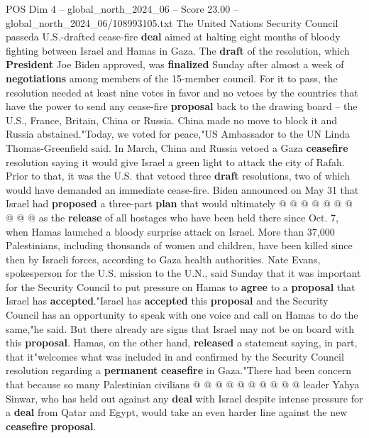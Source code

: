 \begin{textsample}{POS Dim 4 – global\_north\_2024\_06 – Score 23.00 – global\_north\_2024\_06/108993105.txt}  \label{ex:f4_pos_138}
The United Nations Security Council passeda U.S.-drafted cease-fire \textbf{deal} aimed at halting eight months of bloody fighting between Israel and Hamas in Gaza.
The \textbf{draft} of the resolution, which \textbf{President} Joe Biden approved, was \textbf{finalized} Sunday after almost a week of \textbf{negotiations} among members of the 15-member council.
For it to pass, the resolution needed at least nine votes in favor and no vetoes by the countries that have the power to send any cease-fire \textbf{proposal} back to the drawing board -- the U.S., France, Britain, China or Russia.
China made no move to block it and Russia abstained."Today, we voted for peace,"US Ambassador to the UN Linda Thomas-Greenfield said.
In March, China and Russia vetoed a Gaza \textbf{ceasefire} resolution saying it would give Israel a green light to attack the city of Rafah.
Prior to that, it was the U.S. that vetoed three \textbf{draft} resolutions, two of which would have demanded an immediate cease-fire.
Biden announced on May 31 that Israel had \textbf{proposed} a three-part \textbf{plan} that would ultimately @ @ @ @ @ @ @ @ @ @ as the \textbf{release} of all hostages who have been held there since Oct. 7, when Hamas launched a bloody surprise attack on Israel.
More than 37,000 Palestinians, including thousands of women and children, have been killed since then by Israeli forces, according to Gaza health authorities.
Nate Evans, spokesperson for the U.S. mission to the U.N., said Sunday that it was important for the Security Council to put pressure on Hamas to \textbf{agree} to a \textbf{proposal} that Israel has \textbf{accepted}."Israel has \textbf{accepted} this \textbf{proposal} and the Security Council has an opportunity to speak with one voice and call on Hamas to do the same,"he said.
But there already are signs that Israel may not be on board with this \textbf{proposal}.
Hamas, on the other hand, \textbf{released} a statement saying, in part, that it"welcomes what was included in and confirmed by the Security Council resolution regarding a \textbf{permanent} \textbf{ceasefire} in Gaza."There had been concern that because so many Palestinian civilians @ @ @ @ @ @ @ @ @ @ leader Yahya Sinwar, who has held out against any \textbf{deal} with Israel despite intense pressure for a \textbf{deal} from Qatar and Egypt, would take an even harder line against the new \textbf{ceasefire} \textbf{proposal}.

\end{textsample}
